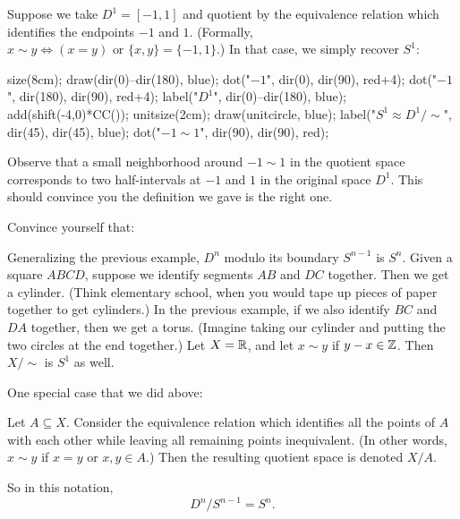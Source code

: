 \begin{example}
	Suppose we take $D^1 = [-1, 1]$
	and quotient by the equivalence relation which identifies
	the endpoints $-1$ and $1$.
	(Formally, $x \sim y \iff (x=y) \text{ or } \{x,y\} = \{-1,1\}$.)
	In that case, we simply recover $S^1$:
	\begin{center}
		\begin{asy}
			size(8cm);
			draw(dir(0)--dir(180), blue);
			dot("$-1$", dir(0), dir(90), red+4);
			dot("$-1$", dir(180), dir(90), red+4);
			label("$D^1$", dir(0)--dir(180), blue);
			add(shift(-4,0)*CC());
			unitsize(2cm);
			draw(unitcircle, blue);
			label("$S^1 \approx D^1 / {\sim}$", dir(45), dir(45), blue);
			dot("$-1 \sim 1$", dir(90), dir(90), red);
		\end{asy}
	\end{center}
	Observe that a small neighborhood around $-1 \sim 1$ in the quotient space
	corresponds to two half-intervals at $-1$ and $1$ in the original space $D^1$.
	This should convince you the definition we gave is the right one.
\end{example}

\begin{example}
	Convince yourself that:
	\begin{itemize}
		\ii Generalizing the previous example, $D^n$ modulo its boundary $S^{n-1}$ is $S^n$.
		\ii Given a square $ABCD$, suppose we identify segments $AB$ and $DC$ together.
		Then we get a cylinder. (Think elementary school, when you would tape
		up pieces of paper together to get cylinders.)
		\ii In the previous example, if we also identify $BC$ and $DA$ together,
		then we get a torus. (Imagine taking our cylinder and putting the two
		circles at the end together.)
		\ii Let $X = \mathbb R$, and let $x \sim y$ if $y -x \in \mathbb Z$.
		Then $X / {\sim}$ is $S^1$ as well.
	\end{itemize}
\end{example}

One special case that we did above:
\begin{definition}
	Let $A \subseteq X$.
	Consider the equivalence relation which identifies
	all the points of $A$ with each other
	while leaving all remaining points inequivalent.
	(In other words, $x \sim y$ if $x=y$ or $x,y \in A$.)
	Then the resulting quotient space is denoted $X/A$.
\end{definition}

So in this notation, \[ D^n / S^{n-1} = S^n. \]

